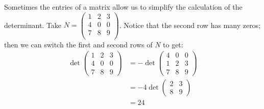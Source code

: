 \begin{example}
Sometimes the entries of a matrix allow us to simplify the calculation of the determinant.  Take $N= \begin{pmatrix}
1 & 2 & 3 \\
4 & 0 & 0 \\
7 & 8 & 9 \\
\end{pmatrix}$.  Notice that the second row has many zeros; then we can switch the first and second rows of $N$ to get:
\begin{align*}
\det \begin{pmatrix}
1 & 2 & 3 \\
4 & 0 & 0 \\
7 & 8 & 9
\end{pmatrix}
& = -\det \begin{pmatrix}
4 & 0 & 0 \\
1 & 2 & 3 \\
7 & 8 & 9
\end{pmatrix}\\
&= -4 \det \begin{pmatrix}
2 & 3 \\
8 & 9
\end{pmatrix} \\
&= 24
\end{align*}
\end{example}
 

